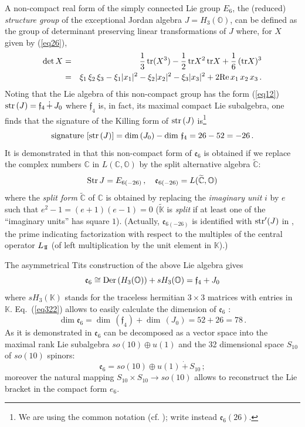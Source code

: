 \documentclass{article}
\newcommand{\be}{\begin{equation}}
\newcommand{\ee}{\end{equation}}
\def\un{{\rm 1\mkern-4mu I}}
\begin{document}
A non-compact real form of the simply connected Lie group $E_6$, the (reduced) {\it structure group} of the exceptional Jordan algebra $J=H_3 ({\mathbb O})$, can be defined as the group of determinant preserving linear transformations of $J$ where, for $X$ given by (\ref{eq26}),
\begin{eqnarray}
\det X &= &\frac13 \, {\rm tr} (X^3) - \frac12 \, {\rm tr} X^2 \, {\rm tr} X + \frac16 \, ({\rm tr} X)^3 \\
&= &\xi_1 \, \xi_2 \, \xi_3 - \xi_1 \vert x_1 \vert^2 - \xi_2 \vert x_2 \vert^2 - \xi_3 \vert x_3 \vert^2 + 2 {\rm Re} \, x_1 \, x_2 \, x_3 \, . \nonumber
\end{eqnarray}
Noting that the Lie algebra of this non-compact group has the form (\ref{eq12}) ${\rm str} \, (J) = {\mathfrak f}_4 \, \dot + \, J_0$ where ${\mathfrak f}_4$ is, in fact, its maximal compact Lie subalgebra, one finds that the signature of the Killing form of ${\rm str} \, (J)$ is\footnote{We are using the common notation (cf. \cite{B}); \cite{BS} write instead ${\mathfrak e}_6(26)$.} 
\be
\label{eq320}
\mbox{signature} \ [{\rm str} \, (J)] = \dim \, (J_0) - \dim \, {\mathfrak f}_4 = 26-52 = -26 \, .
\ee
It is demonstrated in \cite{BS} that this non-compact form of ${\mathfrak e}_6$ is obtained if we replace the complex numbers ${\mathbb C}$ in $L({\mathbb C} , {\mathbb O})$ by the split alternative algebra $\widetilde{\mathbb C}$:
\be
\label{eq321}
{\rm Str} \, J = E_{6 (-26)} \, , \quad {\mathfrak e}_{6 (-26)} = L (\widetilde{\mathbb C} , {\mathbb O})
\ee
where the {\it split form} $\widetilde{\mathbb C}$ of ${\mathbb C}$ is obtained by replacing the {\it imaginary unit} $i$ by $e$ such that $e^2-1 = (e+1)(e-1)=0$ ($\widetilde{\mathbb K}$ is {\it split} if at least one of the ``imaginary units'' has square $1$). (Actually, ${\mathfrak e}_{6(-26)}$ is identified with ${\rm str}' (J)$ in \cite{BS}, the prime indicating factorization with respect to the multiples of the central operator $L_{\un}$ (of left multiplication by the unit element in ${\mathbb K}$).)

\smallskip

The asymmetrical Tits construction of the above Lie algebra gives
\be
\label{eq322}
{\mathfrak e}_6 \cong {\rm Der} \, (H_3 ({\mathbb O})) + sH_3 ({\mathbb O}) = {\mathfrak f}_4 + J_0
\ee
where $sH_3 ({\mathbb K})$ stands for the traceless hermitian $3 \times 3$ matrices with entries in ${\mathbb K}$. Eq.~(\ref{eq322}) allows to easily calculate the dimension of ${\mathfrak e}_6$ :
\be
\label{eq323}
\dim {\mathfrak e}_6 = \dim \, ({\mathfrak f}_4) + \dim \, (J_0) = 52+26 = 78 \, .
\ee
As it is demonstrated in \cite{A} ${\mathfrak e}_6$ can be decomposed as a vector space into the maximal rank Lie subalgebra $so (10) \oplus u(1)$ and the 32 dimensional space $S_{10}$ of $so (10)$ spinors:
\be
\label{eq324}
{\mathfrak e}_6 = so (10) \oplus u(1) \, \dot + \, S_{10} \, ;
\ee
moreover the natural mapping $S_{10} \times S_{10} \to so (10)$ allows to reconstruct the Lie bracket in the compact form $e_6$.
\end{document}
